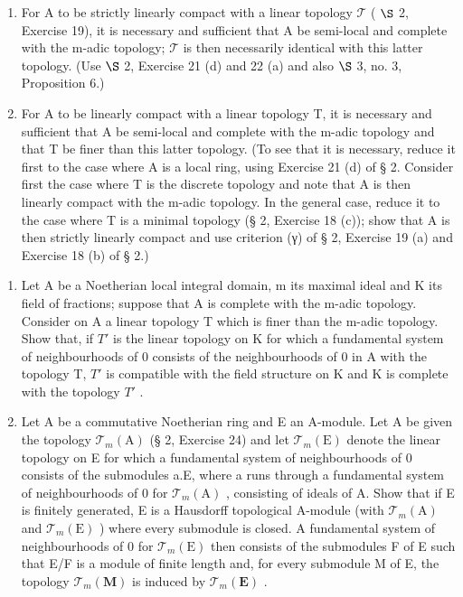 \begin{enumerate}
\def\labelenumi{(\alph{enumi})}
\item
  For A to be strictly linearly compact with a linear topology \(\mathcal{T}\) ( \(\S\) 2, Exercise 19), it is necessary and sufficient that A be semi-local and complete with the m-adic topology; \(\mathcal{T}\) is then necessarily identical with this latter topology. (Use \(\S\) 2, Exercise 21 (d) and 22 (a) and also \(\S\) 3, no. 3, Proposition 6.)
\item
  For A to be linearly compact with a linear topology T, it is necessary and sufficient that A be semi-local and complete with the m-adic topology and that T be finer than this latter topology. (To see that it is necessary, reduce it first to the case where A is a local ring, using Exercise 21 (d) of § 2. Consider first the case where T is the discrete topology and note that A is then linearly compact with the m-adic topology. In the general case, reduce it to the case where T is a minimal topology (§ 2, Exercise 18 (c)); show that A is then strictly linearly compact and use criterion (γ) of § 2, Exercise 19 (a) and Exercise 18 (b) of § 2.)
\end{enumerate}

\begin{enumerate}
\def\labelenumi{\arabic{enumi}.}
\setcounter{enumi}{5}
\item
  Let A be a Noetherian local integral domain, m its maximal ideal and K its field of fractions; suppose that A is complete with the m-adic topology. Consider on A a linear topology T which is finer than the m-adic topology. Show that, if \(T'\) is the linear topology on K for which a fundamental system of neighbourhoods of 0 consists of the neighbourhoods of 0 in A with the topology T, \(T'\) is compatible with the field structure on K and K is complete with the topology \(T'\) .
\item
  Let A be a commutative Noetherian ring and E an A-module. Let A be given the topology \(\mathcal{T}_{m}(\mathrm{A})\) (§ 2, Exercise 24) and let \(\mathcal{T}_{m}(\mathrm{E})\) denote the linear topology on E for which a fundamental system of neighbourhoods of 0 consists of the submodules a.E, where a runs through a fundamental system of neighbourhoods of 0 for \(\mathcal{T}_{m}(\mathrm{A})\) , consisting of ideals of A. Show that if E is finitely generated, E is a Hausdorff topological A-module (with \(\mathcal{T}_{m}(\mathrm{A})\) and \(\mathcal{T}_{m}(\mathrm{E})\) ) where every submodule is closed. A fundamental system of neighbourhoods of 0 for \(\mathcal{T}_{m}(\mathrm{E})\) then consists of the submodules F of E such that E/F is a module of finite length and, for every submodule M of E, the topology \(\mathcal{T}_{m}(\mathbf{M})\) is induced by \(\mathcal{T}_{m}(\mathbf{E})\) .
\end{enumerate}

